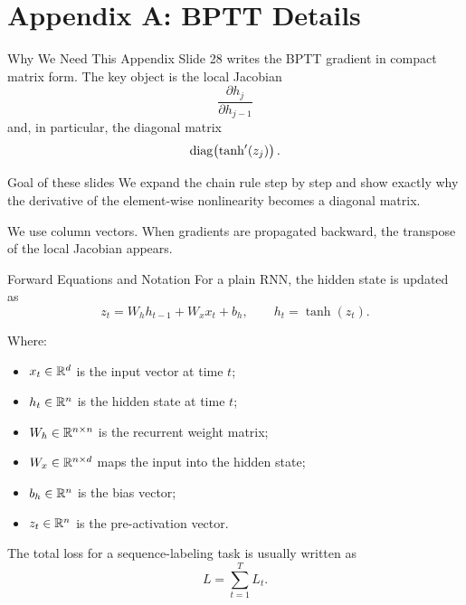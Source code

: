 \documentclass[aspectratio=169]{beamer}
\begin{document}
\section{Appendix A: BPTT Details}
%
\begin{frame}{Why We Need This Appendix}
\small
Slide 28 writes the BPTT gradient in compact matrix form. The key object is the local Jacobian
\[
\frac{\partial h_j}{\partial h_{j-1}}
\]
and, in particular, the diagonal matrix
\[
\operatorname{diag}\!\left(\tanh'(z_j)\right).
\]

\vspace{0.3cm}
\begin{block}{Goal of these slides}
We expand the chain rule step by step and show exactly why the derivative of the element-wise nonlinearity becomes a diagonal matrix.
\end{block}

\vspace{0.2cm}
We use column vectors. When gradients are propagated backward, the transpose of the local Jacobian appears.
\end{frame}
%
%
\begin{frame}{Forward Equations and Notation}
\small
For a plain RNN, the hidden state is updated as
$$
z_t = W_h h_{t-1} + W_x x_t + b_h,
\qquad
h_t = \tanh(z_t).
$$

Where:
\begin{itemize}
    \item $x_t \in \mathbb{R}^d$ is the input vector at time $t$;
    \item $h_t \in \mathbb{R}^n$ is the hidden state at time $t$;
    \item $W_h \in \mathbb{R}^{n \times n}$ is the recurrent weight matrix;
    \item $W_x \in \mathbb{R}^{n \times d}$ maps the input into the hidden state;
    \item $b_h \in \mathbb{R}^n$ is the bias vector;
    \item $z_t \in \mathbb{R}^n$ is the pre-activation vector.
\end{itemize}

\vspace{0.15cm}
The total loss for a sequence-labeling task is usually written as
$$
L = \sum_{t=1}^{T} L_t.
$$
\end{frame}
%
%
\end{document}
